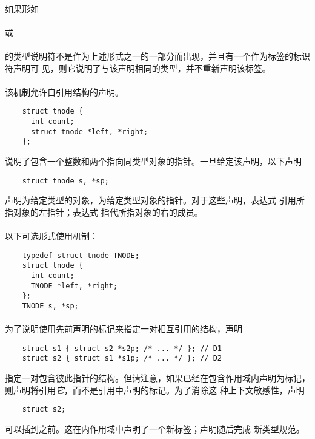 \paragraph{}
如果形如                                                                      \\
\mbox{\hspace{4em}}                            \\
或                                                                            \\
\mbox{\hspace{4em} }                                  \\
的类型说明符不是作为上述形式之一的一部分而出现，并且有一个作为标签的标识符声明可
见，则它说明了与该声明相同的类型，并不重新声明该标签。

\paragraph{}
\ex 该机制允许自引用结构的声明。
\begin{lstlisting}
    struct tnode {
      int count;
      struct tnode *left, *right;
    };
\end{lstlisting}
说明了包含一个整数和两个指向同类型对象的指针。一旦给定该声明，以下声明
\begin{lstlisting}
    struct tnode s, *sp;
\end{lstlisting}
声明为给定类型的对象，为给定类型对象的指针。对于这些声明，表达式
引用所指对象的左指针；表达式
指代所指对象的右的成员。

\paragraph{}
以下可选形式使用机制：
\begin{lstlisting}
    typedef struct tnode TNODE;
    struct tnode {
      int count;
      TNODE *left, *right;
    };
    TNODE s, *sp;
\end{lstlisting}

\paragraph{}
\ex 为了说明使用先前声明的标记来指定一对相互引用的结构，声明
\begin{lstlisting}
    struct s1 { struct s2 *s2p; /* ... */ }; // D1
    struct s2 { struct s1 *s1p; /* ... */ }; // D2
\end{lstlisting}
指定一对包含彼此指针的结构。但请注意，如果已经在包含作用域内声明为标记，
则声明将引用\textit{它}，而不是引用中声明的标记。为了消除这
种上下文敏感性，声明
\begin{lstlisting}
    struct s2;
\end{lstlisting}
可以插到之前。这在内作用域中声明了一个新标签；声明随后完成
新类型规范。

